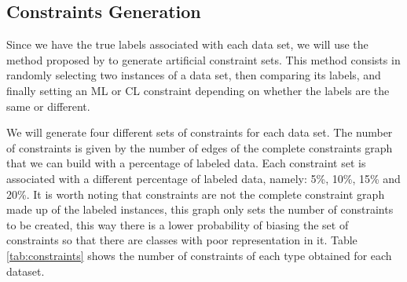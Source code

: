 \documentclass[review]{elsarticle}
\begin{document}
\clearpage

\subsection{Constraints Generation}

Since we have the true labels associated with each data set, we will use the method proposed by \cite{wagstaff2001constrained} to generate artificial constraint sets. This method consists in randomly selecting two instances of a data set, then comparing its labels, and finally setting an ML or CL constraint depending on whether the labels are the same or different.

We will generate four different sets of constraints for each data set. The number of constraints is given by the number of edges of the complete constraints graph that we can build with a percentage of labeled data. Each constraint set is associated with a different percentage of labeled data, namely: 5\%, 10\%, 15\% and 20\%. It is worth noting that constraints are not the complete constraint graph made up of the labeled instances, this graph only sets the number of constraints to be created, this way there is a lower probability of biasing the set of constraints so that there are classes with poor representation in it. Table \ref{tab:constraints} shows the number of constraints of each type obtained for each dataset.
\end{document}
